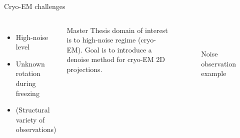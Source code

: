 \documentclass[aspectratio=169]{beamer}
\begin{document}
\begin{frame}[c]{Cryo-EM challenges}
    \begin{columns}[c]
        
        \begin{itemize}
            \item High-noise level 
            \item Unknown rotation during freezing
            \item (Structural variety of observations)
        \end{itemize}

        \begin{tcolorbox}[colback=red!5!white,hide=<-1>, alert=<2>,colframe=red!75!black]
            Master Thesis domain of interest is to high-noise regime (cryo-EM).
            Goal is to introduce a denoise method for cryo-EM 2D projections.
        \end{tcolorbox}

        \begin{figure}
            \centering
             \\
            \caption{Noise observation example}
        \end{figure}

    \end{columns}

\end{frame}
\end{document}
